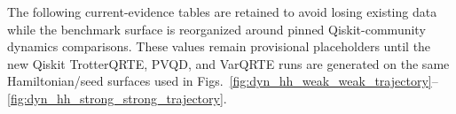 \documentclass[
  reprint,
  amsmath,
  amssymb,
  aps,
  pra,
  nofootinbib,
  superscriptaddress,
  floatfix
]{revtex4-2}
\begin{document}
The following current-evidence tables are retained to avoid losing existing data while the benchmark surface is reorganized around pinned Qiskit-community dynamics comparisons.  These values remain provisional placeholders until the new Qiskit TrotterQRTE, PVQD, and VarQRTE runs are generated on the same Hamiltonian/seed surfaces used in Figs.~\ref{fig:dyn_hh_weak_weak_trajectory}--\ref{fig:dyn_hh_strong_strong_trajectory}.

\end{document}
